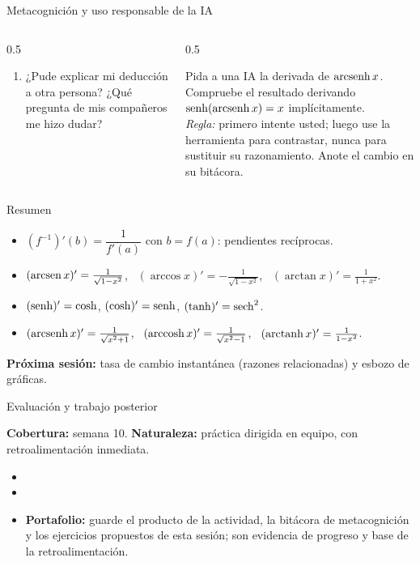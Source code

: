 \documentclass[10pt,aspectratio=169]{beamer}
\begin{document}
\begin{frame}{Metacognición y uso responsable de la IA}
  \small
  \begin{columns}[t]
    \begin{column}{0.5\textwidth}
      \begin{metacog}
        \begin{enumerate}
          \metacomun
          \item ¿Pude explicar mi deducción a otra persona? ¿Qué pregunta de mis compañeros me hizo dudar?
        \end{enumerate}
      \end{metacog}
    \end{column}
    \begin{column}{0.5\textwidth}
      \begin{iabox}
        Pida a una IA la derivada de $\operatorname{arcsenh} x$. Compruebe el resultado derivando $\operatorname{senh}(\operatorname{arcsenh} x)=x$ implícitamente.\\[2pt]
        \textit{Regla:} primero intente usted; luego use la herramienta para contrastar, nunca para sustituir su razonamiento. Anote el cambio en su bitácora.
      \end{iabox}
    \end{column}
  \end{columns}
\end{frame}

\begin{frame}{Resumen}
  \begin{itemize}
    \item $\left(f^{-1}\right)'(b)=\dfrac{1}{f'(a)}$ con $b=f(a)$: pendientes recíprocas.
    \item $(\operatorname{arcsen} x)'=\frac1{\sqrt{1-x^2}}$, \ $(\arccos x)'=-\frac1{\sqrt{1-x^2}}$, \ $(\arctan x)'=\frac1{1+x^2}$.
    \item $(\operatorname{senh})'=\cosh$, $(\cosh)'=\operatorname{senh}$, $(\tanh)'=\operatorname{sech}^2$.
    \item $(\operatorname{arcsenh} x)'=\frac1{\sqrt{x^2+1}}$, \ $(\operatorname{arccosh} x)'=\frac1{\sqrt{x^2-1}}$, \ $(\operatorname{arctanh} x)'=\frac1{1-x^2}$.
  \end{itemize}
  \vspace{3mm}
  \textbf{Próxima sesión:} tasa de cambio instantánea (razones relacionadas) y esbozo de gráficas.
\end{frame}


\begin{frame}{Evaluación y trabajo posterior}
  \small
  \begin{evalbox}
    \textbf{Cobertura:} semana 10. \textbf{Naturaleza:} práctica dirigida en equipo, con retroalimentación inmediata.
  \end{evalbox}
  \begin{itemize}
    \item \criterios
    \item \declaracionia
    \item \textbf{Portafolio:} guarde el producto de la actividad, la bitácora de metacognición y los ejercicios propuestos de esta sesión; son evidencia de progreso y base de la retroalimentación.
  \end{itemize}
\end{frame}
\end{document}
